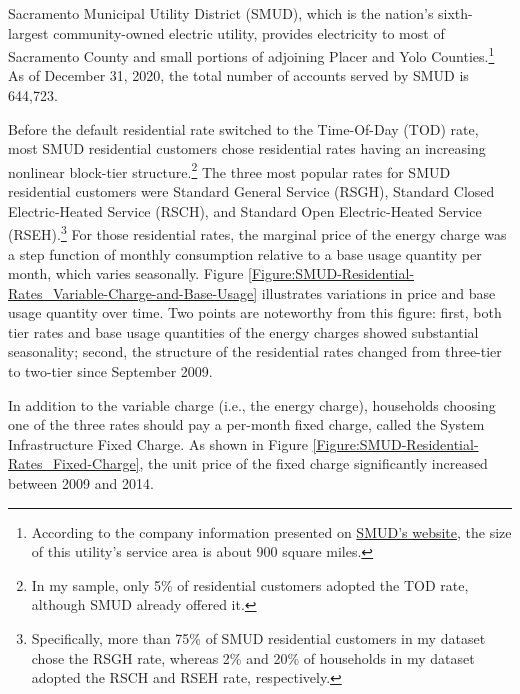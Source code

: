 Sacramento Municipal Utility District (SMUD), which is the nation's sixth-largest community-owned electric utility, provides electricity to most of Sacramento County and small portions of adjoining Placer and Yolo Counties.\footnote{According to the company information presented on \href{https://www.smud.org/en/Corporate/About-us/Company-Information}{SMUD's website}, the size of this utility's service area is about 900 square miles.} As of December 31, 2020, the total number of accounts served by SMUD is 644,723.

Before the default residential rate switched to the Time-Of-Day (TOD) rate, most SMUD residential customers chose residential rates having an increasing nonlinear block-tier structure.\footnote{In my sample, only 5\% of residential customers adopted the TOD rate, although SMUD already offered it.} The three most popular rates for SMUD residential customers were Standard General Service (RSGH), Standard Closed Electric-Heated Service (RSCH), and Standard Open Electric-Heated Service (RSEH).\footnote{Specifically, more than 75\% of SMUD residential customers in my dataset chose the RSGH rate, whereas 2\% and 20\% of households in my dataset adopted the RSCH and RSEH rate, respectively.} For those residential rates, the marginal price of the energy charge was a step function of monthly consumption relative to a base usage quantity per month, which varies seasonally. Figure \ref{Figure:SMUD-Residential-Rates_Variable-Charge-and-Base-Usage} illustrates variations in price and base usage quantity over time. Two points are noteworthy from this figure: first, both tier rates and base usage quantities of the energy charges showed substantial seasonality; second, the structure of the residential rates changed from three-tier to two-tier since September 2009.

In addition to the variable charge (i.e., the energy charge), households choosing one of the three rates should pay a per-month fixed charge, called the System Infrastructure Fixed Charge. As shown in Figure \ref{Figure:SMUD-Residential-Rates_Fixed-Charge}, the unit price of the fixed charge significantly increased between 2009 and 2014. 
